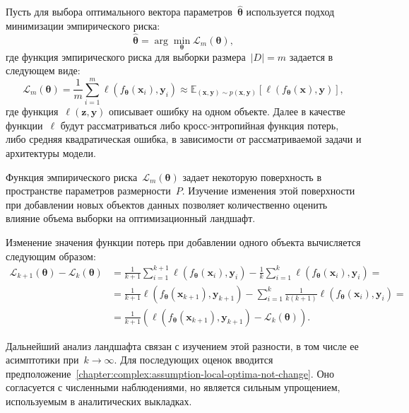 Пусть для выбора оптимального вектора параметров~$\hat{\boldsymbol{\theta}}$ используется подход минимизации эмпирического риска:
\begin{equation}
    \hat{\boldsymbol{\theta}} = \arg\min_{\boldsymbol{\theta}} \mathcal{L}_m(\boldsymbol{\theta}),
\end{equation}
где функция эмпирического риска для выборки размера~$|D|=m$ задается в следующем виде:
\begin{equation}
    \mathcal{L}_m(\boldsymbol{\theta}) = \frac{1}{m} \sum\limits_{i=1}^{m} \ell(f_{\boldsymbol{\theta}}(\mathbf{x}_i), \mathbf{y}_i) \approx \mathbb{E}_{(\mathbf{x}, \mathbf{y}) \sim p(\mathbf{x}, \mathbf{y})} \left[ \ell(f_{\boldsymbol{\theta}}(\mathbf{x}), \mathbf{y}) \right],
\end{equation}
где функция~$\ell\left(\mathbf{z}, \mathbf{y}\right)$ описывает ошибку на одном объекте. Далее в качестве функции~$\ell$ будут рассматриваться либо кросс-энтропийная функция потерь, либо средняя квадратическая ошибка, в зависимости от рассматриваемой задачи и архитектуры модели.

Функция эмпирического риска~$\mathcal{L}_m(\boldsymbol{\theta})$ задает некоторую поверхность в пространстве параметров размерности~$P$. Изучение изменения этой поверхности при добавлении новых объектов данных позволяет количественно оценить влияние объема выборки на оптимизационный ландшафт.

Изменение значения функции потерь при добавлении одного объекта вычисляется следующим образом:
\begin{align}\label{chapter:complex:equation-difference}
    \mathcal{L}_{k+1}(\boldsymbol{\theta}) - \mathcal{L}_k(\boldsymbol{\theta}) &= \frac{1}{k+1}\sum_{i=1}^{k+1}\ell(f_{\boldsymbol{\theta}}(\mathbf{x}_{i}), \mathbf{y}_{i}) - \frac{1}{k}\sum_{i=1}^k\ell(f_{\boldsymbol{\theta}}(\mathbf{x}_{i}), \mathbf{y}_{i}) = \\
    &= \frac{1}{k+1}\ell(f_{\boldsymbol{\theta}}(\mathbf{x}_{k+1}), \mathbf{y}_{k+1})-\sum_{i=1}^{k}\frac{1}{k(k+1)}\ell(f_{\boldsymbol{\theta}}(\mathbf{x}_{i}), \mathbf{y}_{i}) = \\
    &= \frac{1}{k+1} \left(\ell(f_{\boldsymbol{\theta}}(\mathbf{x}_{k+1}), \mathbf{y}_{k+1}) - \mathcal{L}_{k}(\boldsymbol{\theta})\right).
\end{align}

Дальнейший анализ ландшафта связан с изучением этой разности, в том числе ее асимптотики при~$k\to\infty$. Для последующих оценок вводится предположение~\ref{chapter:complex:assumption-local-optima-not-change}. Оно согласуется с численными наблюдениями, но является сильным упрощением, используемым в аналитических выкладках.

